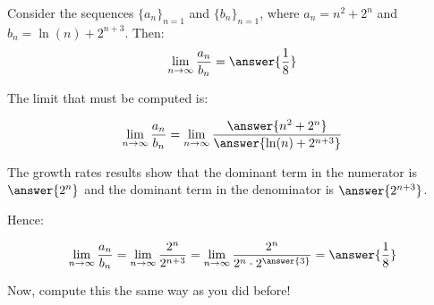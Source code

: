 \documentclass{ximera}
\author{Jim Talamo}
\begin{document}
\begin{exercise}

Consider the sequences $\{a_n \}_{n=1}$ and $\{b_n \}_{n=1}$, where $a_n =n^2+2^n$ and $b_n = \ln(n) +2^{n+3}$.  Then:
\[
\lim_{n \to \infty} \frac{a_n}{b_n} = \answer{\frac{1}{8}}
\]

\begin{hint}
The limit that must be computed is:

\[
\lim_{n \to \infty} \frac{a_n}{b_n} = \lim_{n \to \infty} \frac{\answer{n^2+2^n}}{\answer{\ln(n) +2^{n+3}}}
\]

\begin{question}
The growth rates results show that the dominant term in the numerator is $\answer{2^n}$ and the dominant term in the denominator is $\answer{2^{n+3}}$.  

\begin{question}
Hence:

\[
\lim_{n \to \infty} \frac{a_n}{b_n} = \lim_{n \to \infty} \frac{2^n}{2^{n+3}} =  \lim_{n \to \infty} \frac{2^n}{2^n \cdot 2^{\answer{3}}} =\answer{\frac{1}{8}}
\]

\end{question}
\end{question}
Now, compute this the same way as you did before!
\end{hint}

\end{exercise}
\end{document}
